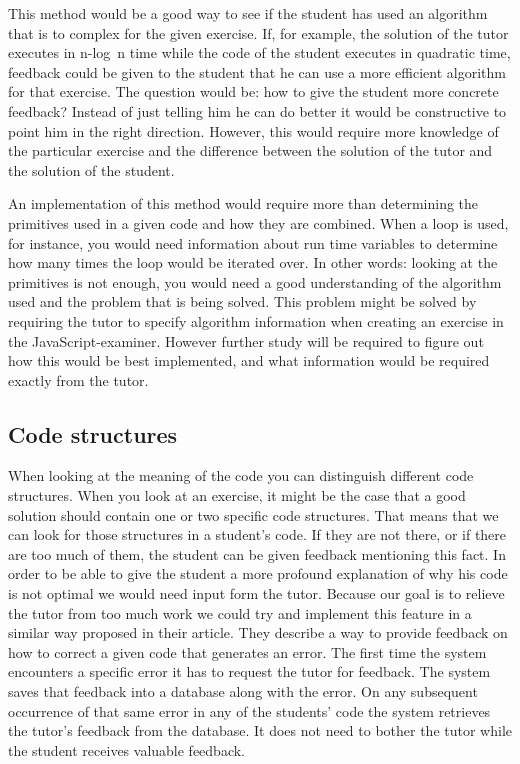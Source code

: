 \documentclass{article}
\begin{document}
This method would be a good way to see if the student has used an algorithm
that is to complex for the given exercise. If, for example, the solution of
the tutor executes in n-log~n time while the code of the student executes in
quadratic time, feedback could be given to the student that he can use a more
efficient algorithm for that exercise. The question would be: how to give the
student more concrete feedback? Instead of just telling him he can do better it
would be constructive to point him in the right direction. However, this would
require more knowledge of the particular exercise and the difference between
the solution of the tutor and the solution of the student.

An implementation of this method would require more than determining the
primitives used in a given code and how they are combined. When a loop is
used, for instance, you would need information about run time variables to
determine how many times the loop would be iterated over. In other words:
looking at the primitives is not enough, you would need a good understanding of
the algorithm used and the problem that is being solved. This problem might be
solved by requiring the tutor to specify algorithm information when creating
an exercise in the JavaScript-examiner. However further study will be
required to figure out how this would be best implemented, and what information
would be required exactly from the tutor.

\subsection{Code structures}

When looking at the meaning of the code you can distinguish different code
structures. When you look at an exercise, it might be the case that a good
solution should contain one or two specific code structures. That means that we
can look for those structures in a student's code. If they are not there, or if
there are too much of them, the student can be given feedback mentioning this
fact. In order to be able to give the student a more profound explanation of
why his code is not optimal we would need input form the tutor. Because our
goal is to relieve the tutor from too much work we could try and implement
this feature in a similar way \citet[Section 3.2]{watson2011learning} proposed
in their article. They describe a way to provide feedback on how to correct a
given code that generates an error. The first time the system encounters a
specific error it has to request the tutor for feedback. The system saves that
feedback into a database along with the error. On any subsequent occurrence of
that same error in any of the students' code the system retrieves the tutor's
feedback from the database. It does not need to bother the tutor while the
student receives valuable feedback.
\end{document}
